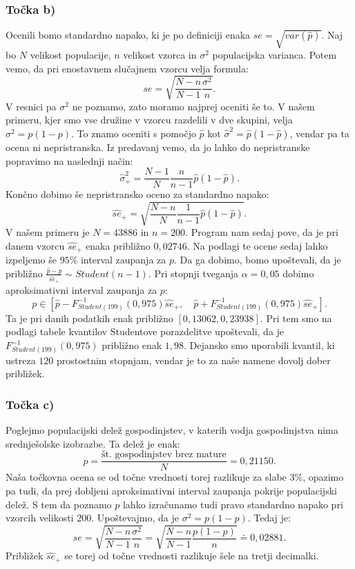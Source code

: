 \documentclass[12pt, letterpaper]{article}
\begin{document}
\subsubsection*{Točka b)} Ocenili bomo standardno napako, ki je po definiciji enaka $se = \sqrt{var(\hat{p})}$. Naj bo $N$ velikost populacije, $n$ velikost vzorca in $\sigma^2$ populacijska varianca. Potem vemo, da pri enostavnem slučajnem vzorcu velja formula:
\[
se = \sqrt{\frac{N-n}{N-1}\frac{\sigma^2}{n}}.
\]
V resnici pa $\sigma^2$ ne poznamo, zato moramo najprej oceniti še to. V našem primeru, kjer smo vse družine v vzorcu razdelili v dve skupini, velja $\sigma^2 = p(1-p)$. To znamo oceniti s pomočjo $\hat{p}$ kot $\hat{\sigma}^2 = \hat{p}(1 - \hat{p})$, vendar pa ta ocena ni nepristranska. Iz predavanj vemo, da jo lahko do nepristranske popravimo na naslednji način:
\[
\hat{\sigma}^2_+ = \frac{N-1}{N}\frac{n}{n-1} \hat{p}(1 - \hat{p}).
\]
Končno dobimo še nepristransko oceno za standardno napako:
\[
\hat{se}_+ = \sqrt{\frac{N-n}{N}\frac{1}{n-1}\hat{p}(1 - \hat{p})}.
\]
V našem primeru je $N = 43886$ in $n = 200$. Program nam sedaj pove, da je pri danem vzorcu $\hat{se}_+$ enaka približno $0,02746$. Na podlagi te ocene sedaj lahko izpeljemo še $95\%$ interval zaupanja za $p$. Da ga dobimo, bomo upoštevali, da je približno $\frac{\hat{p} - p}{\hat{se}_+} \sim Student(n-1)$. Pri stopnji tveganja $\alpha = 0,05$ dobimo aproksimativni interval zaupanja za $p$:
\[
p \in \left[\hat{p} - F_{Student(199)}^{-1}(0,975)\hat{se}_+, \quad \hat{p} + F_{Student(199)}^{-1}(0,975)\hat{se}_+\right].
\]
Ta je pri danih podatkih enak približno $[0,13062, 0,23938]$. Pri tem smo na podlagi tabele kvantilov Studentove porazdelitve upoštevali, da je $F_{Student(199)}^{-1}(0,975)$ približno enak $1,98$. Dejansko smo uporabili kvantil, ki ustreza $120$ prostostnim stopnjam, vendar je to za naše namene dovolj dober približek.

\subsubsection*{Točka c)} Poglejmo populacijski delež gospodinjstev, v katerih vodja gospodinjstva nima srednješolske izobrazbe. Ta delež je enak:
\[
p = \frac{\text{št. gospodinjstev brez mature}}{N} = 0,21150.
\]
Naša točkovna ocena se od točne vrednosti torej razlikuje za slabe $3\%$, opazimo pa tudi, da prej dobljeni aproksimativni interval zaupanja pokrije populacijski delež.
S tem da poznamo $p$ lahko izračunamo tudi pravo standardno napako pri vzorcih velikosti $200$.
Upoštevajmo, da je $\sigma^2 = p(1-p)$. Tedaj je:
\[
se = \sqrt{\frac{N-n}{N-1}\frac{\sigma^2}{n}} = \sqrt{\frac{N-n}{N-1}\frac{p(1-p)}{n}} \doteq 0,02881.
\]
Približek $\hat{se}_+$ se torej od točne vrednosti razlikuje šele na tretji decimalki.
\end{document}
